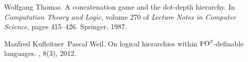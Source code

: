 \documentclass[a4paper,USenglish]{lipics}
\theoremstyle{plain}
\begin{document}
\begin{thebibliography}{10}
Wolfgang Thomas.
\newblock A concatenation game and the dot-depth hierarchy.
\newblock In {\em Computation Theory and Logic}, volume 270 of {\em Lecture
  Notes in Computer Science}, pages 415--426. Springer, 1987.

Manfred Kufleitner~Pascal Weil.
\newblock On logical hierarchies within \(\textup{FO}^{{2}}\)-definable
  languages.
, 8(3), 2012.

\end{thebibliography}
\end{document}
